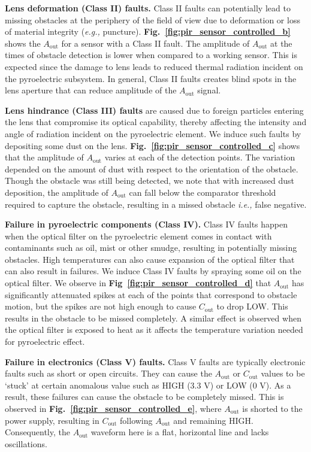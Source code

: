 \documentclass[manuscript]{acmart}
\newcommand{\eg}{{\it e.g.,}\xspace}
\newcommand{\ie}{{\it i.e.,}\xspace}
\newcommand{\cout}{$C_{\text{out}}$\xspace}
\newcommand{\aout}{$A_{\text{out}}$\xspace}
\begin{document}
\textbf{Lens deformation (Class II) faults.} Class II faults can potentially lead to missing obstacles at the periphery of the field of view due to deformation or loss of material integrity (\eg puncture). 
\textbf{Fig.~\ref{fig:pir_sensor_controlled_b}} shows the \aout for a sensor with a Class II fault. The amplitude of \aout at the times of obstacle detection is lower when compared to a working sensor. This is expected since the damage to lens leads to reduced thermal radiation incident on the pyroelectric subsystem. In general, Class II faults creates blind spots in the lens aperture that can reduce amplitude of the \aout signal. 


\textbf{Lens hindrance (Class III) faults} are caused due to foreign particles entering the lens that compromise its optical capability, thereby affecting the intensity and angle of radiation incident on the pyroelectric element. 
We induce such faults by depositing some dust on the lens.
\textbf{Fig.~\ref{fig:pir_sensor_controlled_c}} shows that the amplitude of \aout varies at each of the detection points. The variation depended on the amount of dust with respect to the orientation of the obstacle. Though the obstacle was still being detected, we note that with increased dust deposition, the amplitude of \aout can fall below the comparator threshold required to capture the obstacle, resulting in a missed obstacle \ie false negative. 




\textbf{Failure in pyroelectric components (Class IV).} Class IV faults happen when the optical filter on the pyroelectric element comes in contact with contaminants such as oil, mist or other smudge, resulting in potentially missing obstacles. High temperatures can also cause expansion of the optical filter that can also result in failures. 
We induce Class IV faults by spraying some oil on the optical filter. We observe in {\bfseries Fig~\ref{fig:pir_sensor_controlled_d}} that \aout has significantly attenuated spikes at each of the points that correspond to obstacle motion, but the spikes are not high enough to cause \cout to drop LOW. This results in the obstacle to be missed completely. A similar effect is observed when the optical filter is exposed to heat as it affects the temperature variation needed for pyroelectric effect.


\textbf{Failure in electronics (Class V) faults.} Class V faults are typically electronic faults such as short or open circuits. They can cause the \aout or \cout values to be `stuck' at certain anomalous value such as HIGH (3.3 V) or LOW (0 V). As a result, these failures can cause the obstacle to be completely missed. This is observed in {\bfseries Fig.~\ref{fig:pir_sensor_controlled_e}}, where \aout is shorted to the power supply, resulting in \cout following \aout and remaining HIGH. Consequently, the \aout waveform here is a flat, horizontal line and lacks oscillations. 
\end{document}
